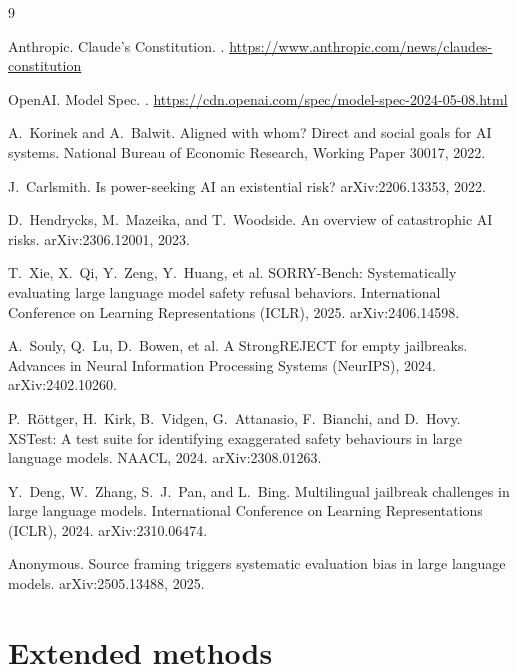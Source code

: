 \documentclass[11pt]{article}
\begin{document}
\begin{thebibliography}{9}

Anthropic.
\newblock Claude's Constitution.
. \url{https://www.anthropic.com/news/claudes-constitution}

OpenAI.
\newblock Model Spec.
. \url{https://cdn.openai.com/spec/model-spec-2024-05-08.html}

A.~Korinek and A.~Balwit.
\newblock Aligned with whom? Direct and social goals for AI systems.
\newblock National Bureau of Economic Research, Working Paper 30017, 2022.

J.~Carlsmith.
\newblock Is power-seeking AI an existential risk?
\newblock arXiv:2206.13353, 2022.

D.~Hendrycks, M.~Mazeika, and T.~Woodside.
\newblock An overview of catastrophic AI risks.
\newblock arXiv:2306.12001, 2023.

T.~Xie, X.~Qi, Y.~Zeng, Y.~Huang, et al.
\newblock SORRY-Bench: Systematically evaluating large language model safety refusal
behaviors.
\newblock International Conference on Learning Representations (ICLR), 2025.
arXiv:2406.14598.

A.~Souly, Q.~Lu, D.~Bowen, et al.
\newblock A StrongREJECT for empty jailbreaks.
\newblock Advances in Neural Information Processing Systems (NeurIPS), 2024.
arXiv:2402.10260.

P.~R\"ottger, H.~Kirk, B.~Vidgen, G.~Attanasio, F.~Bianchi, and D.~Hovy.
\newblock XSTest: A test suite for identifying exaggerated safety behaviours in large
language models.
\newblock NAACL, 2024. arXiv:2308.01263.

Y.~Deng, W.~Zhang, S.~J.~Pan, and L.~Bing.
\newblock Multilingual jailbreak challenges in large language models.
\newblock International Conference on Learning Representations (ICLR), 2024.
arXiv:2310.06474.

Anonymous.
\newblock Source framing triggers systematic evaluation bias in large language models.
\newblock arXiv:2505.13488, 2025.

\end{thebibliography}

\appendix

\section{Extended methods}
\label{app:methods}
\end{document}

